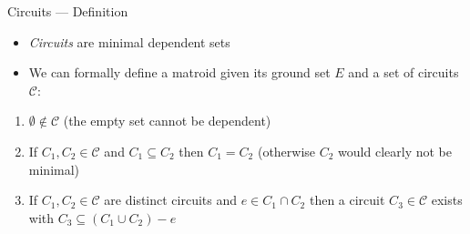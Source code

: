 \documentclass{beamer}
\begin{document}
\begin{frame}{Circuits --- Definition}
    \begin{itemize}
        \item \textit{Circuits} are minimal dependent sets
        \pause
        \item We can formally define a matroid given its ground set $E$ and a set of circuits $\mathcal C$:
    \end{itemize}
        \pause
            \begin{enumerate}
                \item $\emptyset \not\in \mathcal C$ (the empty set cannot be dependent)
                \pause
                \item If $C_1, C_2 \in \mathcal C$ and $C_1 \subseteq C_2$ then $C_1 = C_2$ (otherwise $C_2$ would clearly not be minimal)
                \pause
                \item If $C_1, C_2 \in \mathcal C$ are distinct circuits and $e \in C_1 \cap C_2$ then a circuit $C_3 \in \mathcal C$ exists with $C_3 \subseteq (C_1 \cup C_2) - e$
            \end{enumerate}



\pause



\end{frame}
\end{document}

